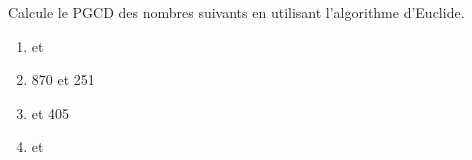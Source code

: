 
Calcule le PGCD des nombres suivants en utilisant l'algorithme d'Euclide.
\begin{multicols}{4}
\begin{enumerate}
  \item {} et 
  \item 870 et 251
  \item {} et 405
  \item {} et 
\end{enumerate}
\end{multicols}
